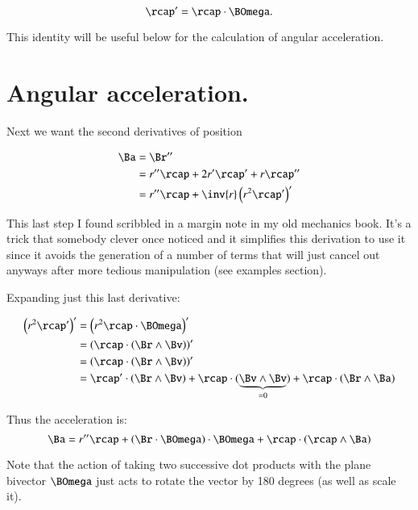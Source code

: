 \begin{equation}\label{eqn:angular_acc:rcapprime}
\rcap' = \rcap \cdot \BOmega.
\end{equation}

This identity will be useful below for the calculation of angular acceleration.

\section{Angular acceleration. }

Next we want the second derivatives of position

\begin{align*}
\Ba 
&= \Br'' \\
&= r'' \rcap + 2r' \rcap' + r \rcap'' \\
&= r'' \rcap + \inv{r}\left( r^2 \rcap' \right)' \\
\end{align*}

This last step I found scribbled in a margin note in 
my old mechanics book.  It's a trick that somebody clever once noticed and it simplifies this derivation to use it
since it avoids the generation of a number of terms that will just cancel out anyways after more tedious manipulation
(see examples section).

Expanding just this last derivative:

\begin{align*}
\left( r^2 \rcap' \right)'
&= \left( r^2 \rcap \cdot \BOmega \right)' \\
&= \left( \rcap \cdot \left(\Br \wedge \Bv\right) \right)' \\
&= \left( \rcap \cdot \left(\Br \wedge \Bv\right) \right)' \\
&= \rcap' \cdot \left(\Br \wedge \Bv\right) +\rcap \cdot (\underbrace{\Bv \wedge \Bv}_{=0}) + \rcap \cdot \left(\Br \wedge \Ba\right) \\
\end{align*}

Thus the acceleration is:
\begin{equation*}
\Ba = r'' \rcap + \left(\Br \cdot \BOmega\right) \cdot \BOmega + \rcap \cdot \left(\rcap \wedge \Ba\right)
\end{equation*}


Note that the action of taking two successive dot products with the plane bivector $\BOmega$ just acts to rotate the
vector by 180 degrees (as well as scale it).

